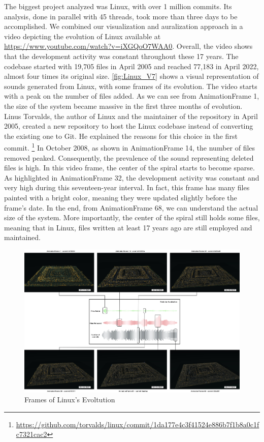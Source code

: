 \documentclass[11pt,twoside,english,singlespacing,headsepline,consistentlayout]{auxiliary/si-msc-thesis}
\begin{document}
The biggest project analyzed was Linux, with over 1 million commits. Its analysis, done in parallel with 45 threads, took more than three days to be accomplished. 
We combined our visualization and auralization approach in a video depicting the evolution of Linux available at \url{https://www.youtube.com/watch?v=iXGQoO7WAA0}. 
Overall, the video shows that the development activity was constant throughout these 17 years. The codebase started with 19,705 files in April 2005 and reached 77,183 in April 2022, almost four times its original size.
\autoref{fig:Linux_V7} shows a visual representation of sounds generated from Linux, with some frames of its evolution. The video starts with a peak on the number of files added. As we can see from AnimationFrame 1, the size of the system became massive in the first three months of evolution. Linus Torvalds, the author of Linux and the maintainer of the repository in April 2005, created a new repository to host the Linux codebase instead of converting the existing one to Git. He explained the reasons for this choice in the first commit. \footnote{\url{https://github.com/torvalds/linux/commit/1da177e4c3f41524e886b7f1b8a0c1fc7321cac2}}
In October 2008, as shown in AnimationFrame 14, the number of files removed peaked. Consequently, the prevalence of the sound representing deleted files is high. In this video frame, the center of the spiral starts to become sparse. As highlighted in AnimationFrame 32, the development activity was constant and very high during this 
seventeen-year interval. In fact, this frame has many files painted with a bright color, meaning they were updated slightly before the frame's date. 
In the end, from AnimationFrame 68, we can understand the actual size of the system. More importantly, the center of the spiral still holds some files, meaning that in Linux, files written at least 17 years ago are still employed and maintained. 

\begin{landscape}
    \Huge 
    \begin{figure}[ht]
    \includegraphics[width=\linewidth]{LinuxAuralization.jpg}
    \caption{Frames of Linux's Evoltution} 
    \label{fig:Linux_V7}
\end{figure}

\end{landscape}
\end{document}
